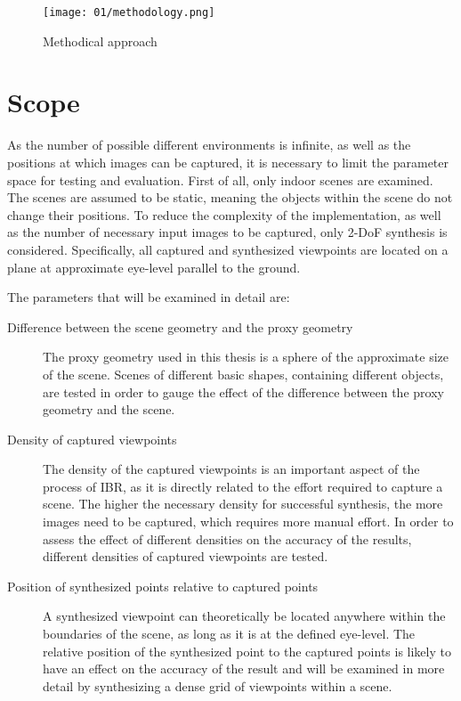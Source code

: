 \begin{figure}
		\centering
		\texttt{[image: 01/methodology.png]}
		\caption{Methodical approach}
		\label{fig:methodology}
\end{figure}


\section*{Scope}
As the number of possible different environments is infinite, as well as the positions at which images can be captured, it is necessary to limit the parameter space for testing and evaluation. First of all, only indoor scenes are examined. The scenes are assumed to be static, meaning the objects within the scene do not change their positions. To reduce the complexity of the implementation, as well as the number of necessary input images to be captured, only 2-DoF synthesis is considered. Specifically, all captured and synthesized viewpoints are located on a plane at approximate eye-level parallel to the ground. 

\noindent
The parameters that will be examined in detail are:
\begin{description}
  \item[Difference between the scene geometry and the proxy geometry] The proxy geometry used in this thesis is a sphere of the approximate size of the scene. Scenes of different basic shapes, containing different objects, are tested in order to gauge the effect of the difference between the proxy geometry and the scene.
  \item[Density of captured viewpoints] The density of the captured viewpoints is an important aspect of the process of IBR, as it is directly related to the effort required to capture a scene. The higher the necessary density for successful synthesis, the more images need to be captured, which requires more manual effort. In order to assess the effect of different densities on the accuracy of the results, different densities of captured viewpoints are tested.
  \item[Position of synthesized points relative to captured points] A synthesized viewpoint can theoretically be located anywhere within the boundaries of the scene, as long as it is at the defined eye-level. The relative position of the synthesized point to the captured points is likely to have an effect on the accuracy of the result and will be examined in more detail by synthesizing a dense grid of viewpoints within a scene.
\end{description}

